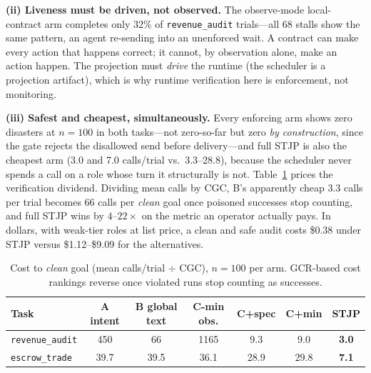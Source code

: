 \documentclass{article}
\newcommand{\stjp}{\textsc{STJP}}
\begin{document}
\textbf{(ii) Liveness must be driven, not observed.} The observe-mode local-contract arm completes only 32\% of \texttt{revenue\_audit} trials---all 68 stalls show the same pattern, an agent re-sending into an unenforced wait. A contract can make every action that happens correct; it cannot, by observation alone, make an action happen. The projection must \emph{drive} the runtime (the scheduler is a projection artifact), which is why runtime verification here is enforcement, not monitoring.

\textbf{(iii) Safest and cheapest, simultaneously.} Every enforcing arm shows zero disasters at $n{=}100$ in both tasks---not zero-so-far but zero \emph{by construction}, since the gate rejects the disallowed send before delivery---and full \stjp{} is also the cheapest arm (3.0 and 7.0 calls/trial vs.\ 3.3--28.8), because the scheduler never spends a call on a role whose turn it structurally is not. Table~\ref{tab:ctcg} prices the verification dividend. Dividing mean calls by CGC, B's apparently cheap 3.3 calls per trial becomes 66 calls per \emph{clean} goal once poisoned successes stop counting, and full \stjp{} wins by $4$--$22\times$ on the metric an operator actually pays. In dollars, with weak-tier roles at list price, a clean and safe audit costs \$0.38 under \stjp{} versus \$1.12--\$9.09 for the alternatives.

\begin{table}[t]
\centering\small
\caption{Cost to \emph{clean} goal (mean calls/trial $\div$ CGC), $n{=}100$ per arm. GCR-based cost rankings reverse once violated runs stop counting as successes.}
\label{tab:ctcg}
\begin{tabular}{@{}lcccccc@{}}
\toprule
\textbf{Task} & \textbf{A intent} & \textbf{B global text} & \textbf{C-min obs.} & \textbf{C+spec} & \textbf{C+min} & \textbf{\stjp{}} \\
\midrule
\texttt{revenue\_audit} & 450 & 66 & 1165 & 9.3 & 9.0 & \textbf{3.0} \\
\texttt{escrow\_trade} & 39.7 & 39.5 & 36.1 & 28.9 & 29.8 & \textbf{7.1} \\
\bottomrule
\end{tabular}
\end{table}
\end{document}

